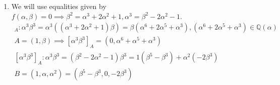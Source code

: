 \documentclass[12pt, a4paper]{article}
\begin{document}
\begin{enumerate}[label=(\alph*)]
\item We will use equalities given by $f(\alpha, \beta) = 0 \implies \beta^2 = \alpha^3+2\alpha^2+1, \alpha^3 = \beta^2-2\alpha^2-1$.
\begin{gather*}
[\alpha^3\beta^3]_A: \alpha^3\beta^3 = \alpha^3((\alpha^3+2\alpha^2+1)\beta) = \beta(\alpha^6+2\alpha^5+\alpha^3), (\alpha^6+2\alpha^5+\alpha^3) \in \mathbb{Q}(\alpha)\\
A=(1,\beta) \implies [\alpha^3\beta^3]_A = (0, \alpha^6+\alpha^5+\alpha^3)\\
[\alpha^3\beta^3]_A: \alpha^3\beta^3 = (\beta^2-2\alpha^2-1)\beta^3 = 1(\beta^5-\beta^3) + \alpha^2(-2\beta^3)\\
B = (1, \alpha, \alpha^2) = (\beta^5-\beta^3, 0, -2\beta^3)
\end{gather*}
\end{enumerate}
\end{document}
